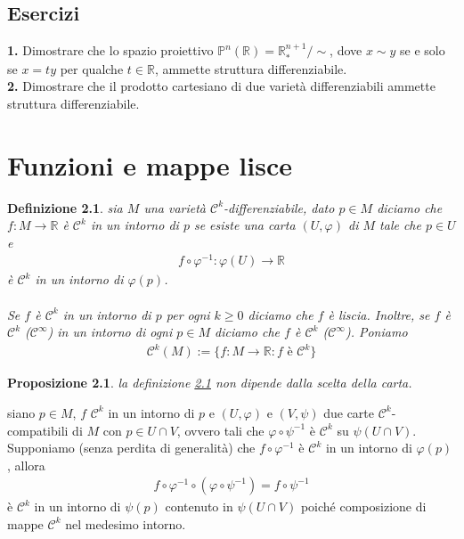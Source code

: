 \documentclass[oneside, 11pt]{amsbook}
\makeatletter
\newcommand{\C}{\mathcal{C}}
\newcommand{\R}{\mathbb{R}}
\newcommand{\vp}{\varphi}
\newcommand{\co}[1]{\textit{#1}}
\newcommand{\gr}[1]{\textbf{#1}}
\newcommand{\0}{{(0)}}
\newcommand{\3}{{(3)}}
\theoremstyle{colonplain}
\newtheorem{prop}[thm]{Proposizione}
\theoremstyle{colondefinition}
\newtheorem{defn}[thm]{Definizione}
\theoremstyle{colonremark}
\numberwithin{equation}{chapter}
\renewcommand{\proofname}{Dimostrazione}
\renewenvironment{proof}[1][\proofname]{\par
  \pushQED{\qed}%
  \normalfont \topsep6\p@\@plus6\p@\relax
  \trivlist
  \item[\hskip\labelsep\bfseries #1:]\ignorespaces
}{%
  \popQED\endtrivlist\@endpefalse
}
\makeatother
\begin{document}
 \section{Esercizi}
\gr{1.} Dimostrare che lo spazio proiettivo $\mathbb{P}^n(\R) = \R^{n + 1}_{*} / \sim$, dove $x \sim y$ se e solo se $x = ty$ per qualche $t \in \R$, ammette struttura differenziabile. \\

\gr{2.} Dimostrare che il prodotto cartesiano di due varietà differenziabili ammette struttura differenziabile.

\chapter{Funzioni e mappe lisce}
\begin{defn}\label{C^k(M, R)}
    sia $M$ una varietà $\C^k$-differenziabile, dato $p \in M$ diciamo che $f : M \longrightarrow \R$ è $\C^k$ in un intorno di $p$ se esiste una carta $(U, \vp)$ di $M$ tale che $p \in U$ e
    \begin{align}
        f \circ \vp^{-1} : \vp(U) \longrightarrow \R
    \end{align} 
    è $\C^k$ in un intorno di $\vp(p)$. \\ \\
    Se $f$ è $\C^k$ in un intorno di $p$ per ogni $k \geq 0$ diciamo che $f$ è \co{liscia}. Inoltre, se $f$ è $\C^k$ ($\C^\infty$) in un intorno di ogni $p \in M$ diciamo che $f$ è $\C^k$ ($\C^\infty$). Poniamo
    \begin{align}
        \C^k(M) := \{f : M \longrightarrow \R : f \text{ è } \C^k\}
    \end{align}
\end{defn}
\begin{prop}\label{ChartIndipC^k(M, R)}
    la definizione \ref{C^k(M, R)} non dipende dalla scelta della carta.
\end{prop}
\begin{proof}
    siano $p \in M$, $f$ $\C^k$ in un intorno di $p$ e $(U, \vp)$ e $(V, \psi)$ due carte $\C^k$-compatibili di $M$ con $p \in U \cap V$, ovvero tali che $\vp \circ \psi^{-1}$ è $\C^k$ su $\psi(U \cap V)$. \\
    Supponiamo (senza perdita di generalità) che $f \circ \vp^{-1}$ è $\C^k$ in un intorno di $\vp(p)$, allora
    \begin{align}
        f \circ \vp^{-1} \circ (\vp \circ \psi^{-1}) = f \circ \psi^{-1}
    \end{align}
    è $\C^k$ in un intorno di $\psi(p)$ contenuto in $\psi(U \cap V)$ poiché composizione di mappe $\C^k$ nel medesimo intorno.
\end{proof}
\end{document}
